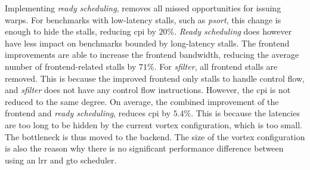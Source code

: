 Implementing \textit{ready scheduling}, removes all missed opportunities for issuing warps. For benchmarks with low-latency stalls, such as \textit{psort}, this change is enough to hide the stalls, reducing \acrshort{cpi} by $20\%$. \textit{Ready scheduling} does however have less impact on benchmarks bounded by long-latency stalls. The frontend improvements are able to increase the frontend bandwidth, reducing the average number of frontend-related stalls by $71\%$. For \textit{sfilter}, all frontend stalls are removed. This is because the improved frontend only stalls to handle control flow, and \textit{sfilter} does not have any control flow instructions. However, the \acrshort{cpi} is not reduced to the same degree. On average, the combined improvement of the frontend and \textit{ready scheduling}, reduces \acrshort{cpi} by $5.4\%$. This is because the latencies are too long to be hidden by the current \Gls{vortex} configuration, which is too small. The bottleneck is thus moved to the backend. The size of the \Gls{vortex} configuration is also the reason why there is no significant performance difference between using an \acrshort{lrr} and \acrshort{gto} scheduler.